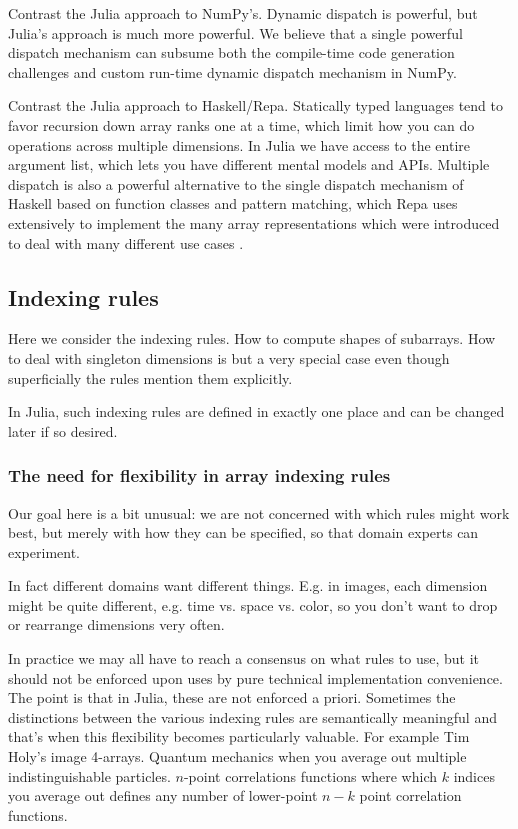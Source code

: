 \documentclass[preprint]{sigplanconf}
\begin{document}
Contrast the Julia approach to NumPy's. Dynamic dispatch is powerful, but
Julia's approach is much more powerful. We believe that a single powerful
dispatch mechanism can subsume both the compile-time code generation
challenges and custom run-time dynamic dispatch mechanism in NumPy.

Contrast the Julia approach to Haskell/Repa. Statically typed languages tend
to favor recursion down array ranks one at a time, which limit how you can do
operations across multiple dimensions. In Julia we have access to the entire
argument list, which lets you have different mental models and APIs.
Multiple dispatch is also a powerful alternative to the single dispatch
mechanism of Haskell based on function classes and pattern matching, which Repa
uses extensively to implement the many array representations which were
introduced to deal with many different use cases
\cite{Lippmeier:2011ep,Lippmeier:2012gp}.

\subsection{Indexing rules}

Here we consider the indexing rules. How to compute shapes of subarrays. How
to deal with singleton dimensions is but a very special case even though
superficially the rules mention them explicitly.

In Julia, such indexing rules are defined in exactly one place and can be
changed later if so desired.

\subsubsection{The need for flexibility in array indexing rules}

Our goal here is a bit unusual: we are not concerned with which rules might
work best, but merely with how they can be specified, so that domain experts
can experiment.

In fact different domains want different things. E.g. in images, each
dimension might be quite different, e.g. time vs. space vs. color, so you
don't want to drop or rearrange dimensions very often.

In practice we may all have to reach a consensus on what rules to use, but it
should not be enforced upon uses by pure technical implementation convenience.
The point is that in Julia, these are not enforced a priori. Sometimes the
distinctions between the various indexing rules are semantically meaningful
and that's when this flexibility becomes particularly valuable. For example
Tim Holy's image 4-arrays. Quantum mechanics when you average out multiple
indistinguishable particles. $n$-point correlations functions where which $k$
indices you average out defines any number of lower-point $n-k$ point
correlation functions.
\end{document}
